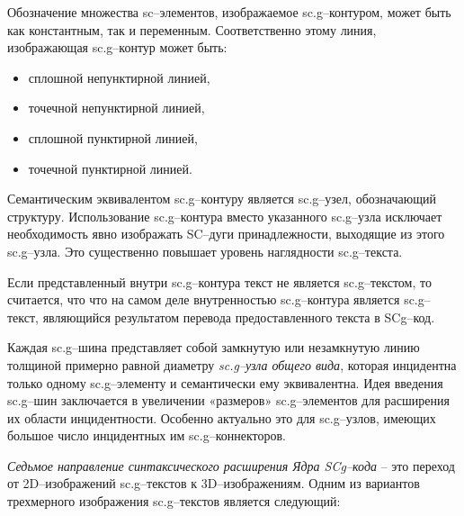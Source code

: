 Обозначение множества sc--элементов, изображаемое sc.g--контуром, может быть как константным, так и переменным. Соответственно этому линия, изображающая sc.g--контур может быть: 

\begin{itemize}
	\item сплошной непунктирной линией,
	\item точечной непунктирной линией,
	\item сплошной пунктирной линией,
	\item точечной пунктирной линией.
\end{itemize}

\bigskip
Семантическим эквивалентом sc.g--контуру является sc.g--узел, обозначающий структуру. Использование sc.g--контура вместо указанного sc.g--узла исключает необходимость явно изображать SC--дуги принадлежности, выходящие из этого sc.g--узла. Это существенно повышает уровень наглядности sc.g--текста.

Если представленный внутри sc.g--контура текст не является sc.g--текстом, то считается, что что на самом деле внутренностью sc.g--контура является sc.g--текст, являющийся результатом перевода предоставленного текста в SCg--код.



Каждая sc.g--шина представляет собой замкнутую или незамкнутую линию толщиной примерно равной диаметру \textit{sc.g--узла общего вида}, которая инцидентна только одному sc.g--элементу и семантически ему эквивалентна. Идея введения sc.g--шин заключается в увеличении «размеров» sc.g--элементов для расширения их области инцидентности. Особенно актуально это для sc.g--узлов, имеющих большое число инцидентных им sc.g--коннекторов.


	
\textit{Седьмое направление синтаксического расширения Ядра SCg--кода} -- это переход от 2D--изображений sc.g--текстов к 3D--изображениям.
Одним из вариантов трехмерного изображения sc.g--текстов является следующий:

